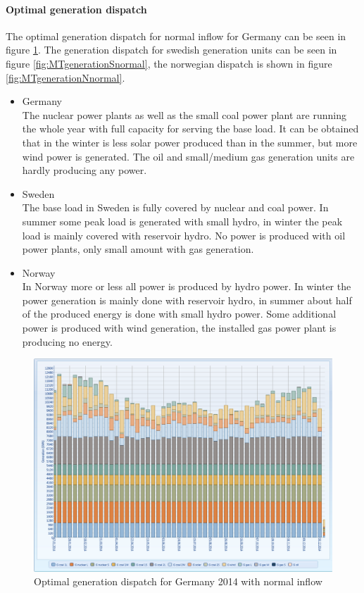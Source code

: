 \documentclass{article}
\begin{document}
\paragraph{Optimal generation dispatch\\}
The optimal generation dispatch for normal inflow for Germany can be seen in figure \ref{fig:MTgenerationGnormal}. The generation dispatch for swedish generation units can be seen in figure \ref{fig:MTgenerationSnormal}, the norwegian dispatch is shown in figure \ref{fig:MTgenerationNnormal}.
\begin{itemize}
\item Germany\\
The nuclear power plants as well as the small coal power plant are running the whole year with full capacity for serving the base load. It can be obtained that in the winter is less solar power produced than in the summer, but more wind power is generated. The oil and small/medium gas generation units are hardly producing any power.
\item Sweden\\
The base load in Sweden is fully covered by nuclear and coal power. In summer some peak load is generated with small hydro, in winter the peak load is mainly covered with reservoir hydro. No power is produced with oil power plants, only small amount with gas generation.
\item Norway\\
In Norway more or less all power is produced by hydro power. In winter the power generation is mainly done with reservoir hydro, in summer about half of the produced energy is done with small hydro power. Some additional power is produced with wind generation, the installed gas power plant is producing no energy.
\end{itemize}
\begin{figure}[htbp]
\begin{center}
\includegraphics[width=13cm,keepaspectratio=true]{figures/MTgenerationG}
\caption{Optimal generation dispatch for Germany 2014 with normal inflow}
\label{fig:MTgenerationGnormal}
\end{center}
\end{figure}
\end{document}
